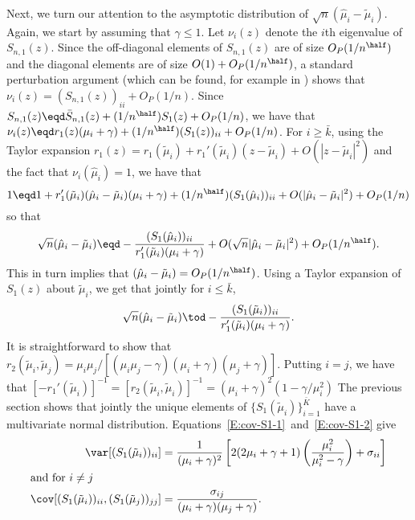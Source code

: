 Next, we turn our attention to the asymptotic distribution of 
$\sqrt{n} (\hat \mu_i - \tilde \mu_i)$.  Again, we start by assuming that $\gamma \leq 1$.  Let $\nu_i(z)$ denote the $i$th
eigenvalue of $S_{n,1}(z)$.  Since the off-diagonal elements of $S_{n,1}(z)$ are
of size $O_P(1/n^\half)$ and the diagonal elements are of size
$O(1) + O_P(1/n^\half)$, a standard perturbation argument
(which can be found, for example in \cite{anderson1963atp}) shows that
$\nu_i(z) = (S_{n,1}(z))_{ii} + O_P(1/n)$.
Since $S_{n,1}(z) \eqd \bar S_{n,1}(z) + (1/n^\half) S_1(z) + O_P(1/n)$, we
have that 
$\nu_i(z) \eqd r_1(z) (\mu_i + \gamma) + (1/n^\half) (S_1(z))_{ii} + O_P(1/n)$.
For $i \geq \bar k$, using the Taylor expansion 
$r_1(z) = r_1 (\tilde \mu_i) + r_1'(\tilde \mu_i) (z - \tilde \mu_i) + O(|z - \tilde \mu_i|^2)$
and the fact that $\nu_i (\hat \mu_i) = 1$, we have that
\[
    1 \eqd 1 
            + r_1' (\tilde \mu_i)(\hat \mu_i - \tilde \mu_i)(\mu_i + \gamma) 
            + (1/n^\half) (S_1(\hat \mu_i))_{ii}
            + O(|\hat \mu_i - \tilde \mu_i|^2) 
            + O_P(1/n)
\]
so that
\[
    \sqrt{n} (\hat \mu_i - \tilde \mu_i)
    \eqd
        -\frac{(S_1(\hat \mu_i))_{ii}}
              {r_1' (\tilde \mu_i) (\mu_i + \gamma)}
        + O(\sqrt{n}|\hat \mu_i - \tilde \mu_i|^2)       
        + O_P(1/n^\half).
\]
This in turn implies that $(\hat \mu_i - \tilde \mu_i) = O_P(1/n^\half)$.
Using a Taylor expansion of $S_1(z)$ about $\tilde \mu_i$, we get that jointly
for $i \leq \bar k$,
\[
    \sqrt{n} (\hat \mu_i - \tilde \mu_i)
        \tod -\frac{(S_1(\tilde \mu_i))_{ii}}
                   {r_1' (\tilde \mu_i) (\mu_i + \gamma)}.
\]
It is straightforward to show that 
\(
    r_2(\tilde \mu_i, \tilde \mu_j) 
    =
    \mu_i \mu_j 
    / 
    [ (\mu_i \mu_j - \gamma) (\mu_i + \gamma) (\mu_j + \gamma) ].
\)
Putting $i = j$, we have that
\(
    \left[ -r_1'(\tilde \mu_i ) \right]^{-1}
    =
    \left[ r_2(\tilde \mu_i, \tilde \mu_i) \right]^{-1}
    =
    \left( \mu_i + \gamma \right)^2
    \left( 1 - \gamma/\mu_i^2 \right)
\)
The previous section shows that jointly the unique elements
of $\{ S_1(\tilde \mu_i) \}_{i=1}^{\bar K}$ have a multivariate normal distribution.
Equations~\eqref{E:cov-S1-1}~and~\eqref{E:cov-S1-2} give
\begin{align*}
    \var [ (S_1(\tilde \mu_i))_{ii} ]
        &= \frac{1}{(\mu_i + \gamma)^2}
           \left[
               2 ( 2 \mu_i + \gamma + 1 )
               \left(
                   \frac{\mu_i^2}{\mu_i^2 - \gamma}
               \right)
               +
               \sigma_{ii}
           \right] \\
\intertext{and for $i \neq j$}
    \cov [ (S_1(\tilde \mu_i))_{ii},  (S_1(\tilde \mu_j))_{jj}]
        &= \frac{\sigma_{ij}}
                {(\mu_i + \gamma)(\mu_j + \gamma)}.
\end{align*}
